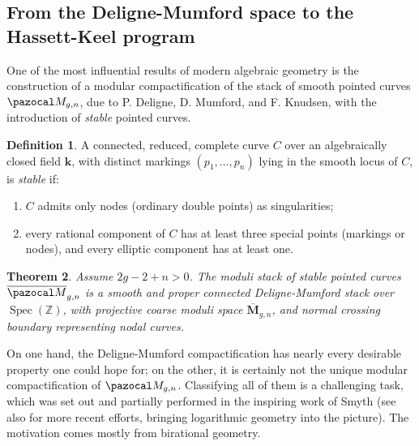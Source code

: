 \documentclass{compositio}
\renewcommand{\k}{\mathbf k}
\newcommand{\oM}{\overline{\pazocal M}}
\theoremstyle{plain}
\newtheorem{thm}{Theorem}[section]
\theoremstyle{definition}
\newtheorem{definition}[thm]{Definition}
\theoremstyle{remark}
\begin{document}
\subsection{From the Deligne-Mumford space to the Hassett-Keel program} One of the most influential results of modern algebraic geometry is the construction of a modular compactification of the stack of smooth pointed curves $\pazocal M_{g,n}$, due to P. Deligne, D. Mumford, and F. Knudsen, with the introduction of \emph{stable} pointed curves.

\begin{definition}\cite{DM}
 A connected, reduced, complete curve $C$ over an algebraically closed field $\k$, with distinct markings $(p_1,\ldots,p_n)$ lying in the smooth locus of $C$, is \emph{stable} if:
 \begin{enumerate}[leftmargin=.7cm]
  \item $C$ admits only nodes (ordinary double points) as singularities;
  \item every rational component of $C$ has at least three special points (markings or nodes), and every elliptic component has at least one.
 \end{enumerate}
\end{definition}

\begin{thm} \cite{DM,Knudsen}
 Assume $2g-2+n>0$. The moduli stack of stable pointed curves $\oM_{g,n}$ is a smooth and proper connected Deligne-Mumford stack over $\operatorname{Spec}(\mathbb Z)$, with projective coarse moduli space $\overline{\mathbf M}_{g,n}$, and normal crossing boundary representing nodal curves.
\end{thm}
On one hand, the Deligne-Mumford compactification has nearly every desirable property one could hope for; on the other, it is certainly not the unique modular compactification of $\pazocal M_{g,n}$. Classifying all of them is a challenging task, which was set out and partially performed in the inspiring work of Smyth \cite{SMY-towards} (see also \cite{Bozlee-thesis} for more recent efforts, bringing logarithmic geometry into the picture). The motivation comes mostly from birational geometry.
\end{document}

